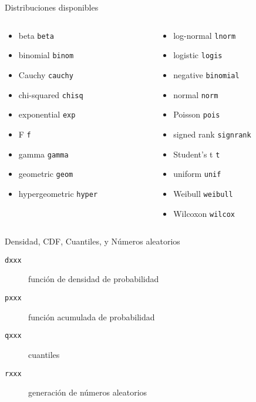 \documentclass[xcolor={usenames,svgnames,dvipsnames}]{beamer}
\begin{document}
\begin{frame}[fragile,label={sec:org67bf68f}]{Distribuciones disponibles}
 \begin{columns}
\begin{column}{.5\columnwidth}
\begin{itemize}
\item beta \texttt{beta}
\item binomial \texttt{binom}
\item Cauchy \texttt{cauchy}
\item chi-squared \texttt{chisq}
\item exponential \texttt{exp}
\item F \texttt{f}
\item gamma \texttt{gamma}
\item geometric \texttt{geom}
\item hypergeometric \texttt{hyper}
\end{itemize}
\end{column}
\begin{column}{.5\columnwidth}
\begin{itemize}
\item log-normal \texttt{lnorm}
\item logistic \texttt{logis}
\item negative \texttt{binomial}
\item normal \texttt{norm}
\item Poisson \texttt{pois}
\item signed rank \texttt{signrank}
\item Student’s t \texttt{t}
\item uniform \texttt{unif}
\item Weibull \texttt{weibull}
\item Wilcoxon \texttt{wilcox}
\end{itemize}
\end{column}
\end{columns}
\end{frame}

\begin{frame}[fragile,label={sec:orgc67efbb}]{Densidad, CDF, Cuantiles, y Números aleatorios}
 \begin{description}
\item[{\texttt{dxxx}}] función de densidad de probabilidad
\item[{\texttt{pxxx}}] función acumulada de probabilidad
\item[{\texttt{qxxx}}] cuantiles
\item[{\texttt{rxxx}}] generación de números aleatorios
\end{description}
\end{frame}
\end{document}
